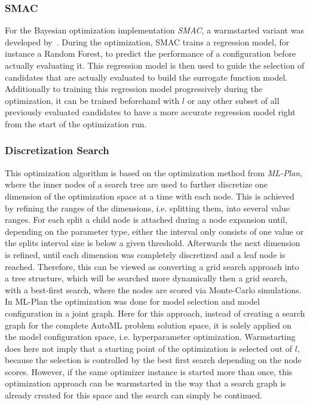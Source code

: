 \subsubsection{SMAC}
For the Bayesian optimization implementation \textit{SMAC}, a warmstarted variant was developed by~\textcite{Lindauer-Smac-Warmstart}.
During the optimization, SMAC trains a regression model, for instance a Random Forest, to predict the performance of a configuration before actually evaluating it.
This regression model is then used to guide the selection of candidates that are actually evaluated to build the surrogate function model.
Additionally to training this regression model progressively during the optimization, it can be trained beforehand with $l$ or any other subset of all previously evaluated candidates to have a more accurate regression model right from the start of the optimization run.

\subsubsection{Discretization Search}
This optimization algorithm is based on the optimization method from \textit{ML-Plan}, where the inner nodes of a search tree are used to further discretize one dimension of the optimization space at a time with each node.
This is achieved by refining the ranges of the dimensions, i.e. splitting them, into several value ranges.
For each split a child node is attached during a node expansion until, depending on the parameter type, either the interval only consists of one value or the splits interval size is below a given threshold.
Afterwards the next dimension is refined, until each dimension was completely discretized and a leaf node is reached.\newline
Therefore, this can be viewed as converting a grid search approach into a tree structure, which will be searched more dynamically then a grid search, with a best-first search, where the nodes are scored via Monte-Carlo simulations.\newline 
In ML-Plan the optimization was done for model selection and model configuration in a joint graph.
Here for this approach, instead of creating a search graph for the complete AutoML problem solution space, it is solely applied on the model configuration space, i.e. hyperparameter optimization.\newline
Warmstarting does here not imply that a starting point of the optimization is selected out of $l$, because the selection is controlled by the best first search depending on the node scores.
However, if the same optimizer instance is started more than once, this optimization approach can be warmstarted in the way that a search graph is already created for this space and the search can simply be continued.
